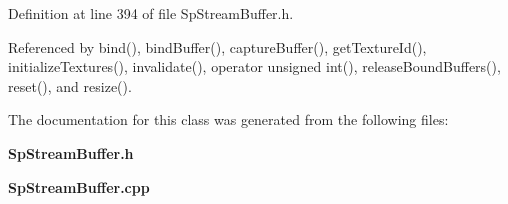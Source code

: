 Definition at line 394 of file Sp\-Stream\-Buffer.h.

Referenced by bind(), bind\-Buffer(), capture\-Buffer(), get\-Texture\-Id(), initialize\-Textures(), invalidate(), operator unsigned int(), release\-Bound\-Buffers(), reset(), and resize().

The documentation for this class was generated from the following files:\begin{CompactItemize}
\item 
{\bf Sp\-Stream\-Buffer.h}\item 
{\bf Sp\-Stream\-Buffer.cpp}\end{CompactItemize}
